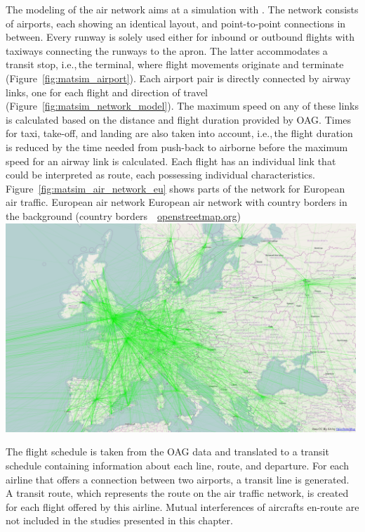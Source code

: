 The modeling of the air network aims at a simulation with .  
The network consists of airports, each showing an identical layout, and point-to-point connections in between. 
Every runway is solely used either for inbound or outbound flights with taxiways connecting the runways to the apron. The latter accommodates a transit stop, i.e.,\,the terminal, where flight movements originate and terminate (Figure~\ref{fig:matsim_airport}). 
Each airport pair is directly connected by airway links, one for each flight and direction of travel (Figure~\ref{fig:matsim_network_model}). 
The maximum speed on any of these links is calculated based on the distance and flight duration provided by OAG. 
Times for taxi, take-off, and landing are also taken into account, i.e.,\,the flight duration is reduced by the time needed from push-back to airborne before the maximum speed for an airway link is calculated.
Each flight has an individual link that could be interpreted as route, each possessing individual characteristics. 
Figure~\ref{fig:matsim_air_network_eu} shows parts of the network for European air traffic.
%
\createfigure%
{European air network}%
{European air network with country borders in the background (country borders~\textcopyright~\url{openstreetmap.org})}%
{\label{fig:matsim_air_network_eu}}%
{\includegraphics[width=0.99\textwidth, angle=0]{extending/figures/air/air_network_europe_osm.png}}%
{\citet{Grether2014PhD}}


The flight schedule is taken from the OAG data and translated to a  transit schedule containing information about each line, route, and departure. 
For each airline that offers a connection between two airports, a transit line is generated. 
A transit route, which represents the route on the air traffic network, is created for each flight offered by this airline. 
Mutual interferences of aircrafts en-route are not included in the studies presented in this chapter.

